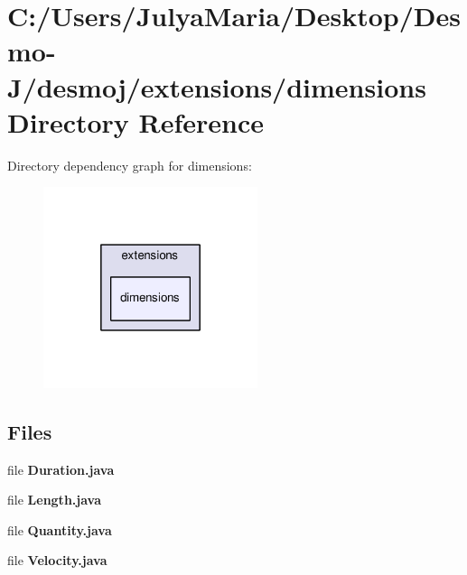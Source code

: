 \section{C\-:/\-Users/\-Julya\-Maria/\-Desktop/\-Desmo-\/\-J/desmoj/extensions/dimensions Directory Reference}
\label{dir_353ca43dc5f49797a17fc739a2bdacaa}
Directory dependency graph for dimensions\-:
\nopagebreak
\begin{figure}[H]
\begin{center}
\leavevmode
\includegraphics[width=178pt]{dir_353ca43dc5f49797a17fc739a2bdacaa_dep}
\end{center}
\end{figure}
\subsection*{Files}
\begin{DoxyCompactItemize}
\item 
file {\bfseries Duration.\-java}
\item 
file {\bfseries Length.\-java}
\item 
file {\bfseries Quantity.\-java}
\item 
file {\bfseries Velocity.\-java}
\end{DoxyCompactItemize}
